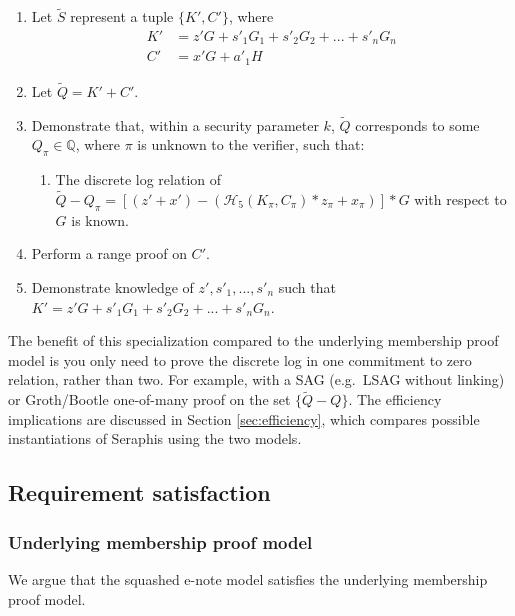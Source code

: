 \begin{appendices}
\begin{enumerate}
    \item Let $\tilde{S}$ represent a tuple $\{K', C'\}$, where\vspace{.115cm}
    \begin{align*}
        K' &= z' G + s'_1 G_1 + s'_2 G_2 + ... + s'_n G_n \\
        C' &= x' G + a'_1 H
    \end{align*}

    \item Let $\tilde{Q} = K' + C'$.

    \item Demonstrate that, within a security parameter $k$, $\tilde{Q}$ corresponds to some $Q_{\pi} \in \mathbb{Q}$, where $\pi$ is unknown to the verifier, such that:
    \begin{enumerate}
        \item The discrete log relation of $\tilde{Q} - Q_{\pi} = [(z' + x') - (\mathcal{H}_5(K_{\pi}, C_{\pi})*z_{\pi} + x_{\pi})]*G$ with respect to $G$ is known.
    \end{enumerate}

    \item Perform a range proof on $C'$.

    \item Demonstrate knowledge of $z', s'_1,...,s'_n$ such that $K' = z' G + s'_1 G_1 + s'_2 G_2 + ... + s'_n G_n$.
\end{enumerate}

The benefit of this specialization compared to the underlying membership proof model is you only need to prove the discrete log in one commitment to zero relation, rather than two. For example, with a SAG (e.g.\ LSAG \cite{Liu2004} without linking) or Groth/Bootle one-of-many proof on the set $\{\tilde{Q} - Q\}$. The efficiency implications are discussed in Section \ref{sec:efficiency}, which compares possible instantiations of Seraphis using the two models.


\subsection{Requirement satisfaction}
\label{appendix:squashed-e-note-model-req-satisfaction}

\subsubsection{Underlying membership proof model}

We argue that the squashed e-note model satisfies the underlying membership proof model.


\end{appendices}
